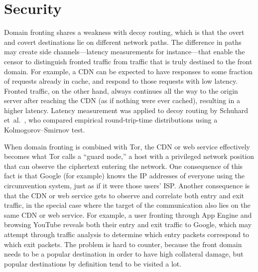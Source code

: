\documentclass[conference]{IEEEtran}
\begin{document}
\section{Security}

Domain fronting shares a weakness with decoy routing,
which is that the overt and covert destinations lie on different
network paths.
The difference in paths may create side channels---latency measurements for instance---that
enable the censor to
distinguish fronted traffic from traffic that is truly destined
to the front domain.
For example, a CDN can be expected to have responses
to some fraction of requests already in cache,
and respond to those requests with low latency.
Fronted traffic, on the other hand, always continues all the way
to the origin server after reaching the CDN (as if nothing were ever cached),
resulting in a higher latency.
Latency measurement was applied to decoy routing by Schuhard et~al.~\cite[Section~5]{ccs2012-decoys},
who compared empirical round-trip-time distributions using a
Kolmogorov--Smirnov test.

When domain fronting is combined with Tor,
the CDN or web service effectively becomes
what Tor calls a ``guard node,''
a host with a privileged network position that can observe
the ciphertext entering the network.
One consequence of this fact is that Google (for example)
knows the IP addresses of everyone using the circumvention system,
just as if it were those users' ISP.
Another consequence is that the CDN or web service gets
to observe and correlate both entry and exit traffic,
in the special case where the target of the communication
also lies on the same CDN or web service.
For example, a user fronting through App Engine and
browsing YouTube reveals both their entry and exit traffic to Google,
which may attempt through traffic analysis to determine
which entry packets correspond to which exit packets.
The problem is hard to counter, because the front domain needs
to be a popular destination in order to have high collateral damage,
but popular destinations by definition tend to be visited a lot.

\end{document}
